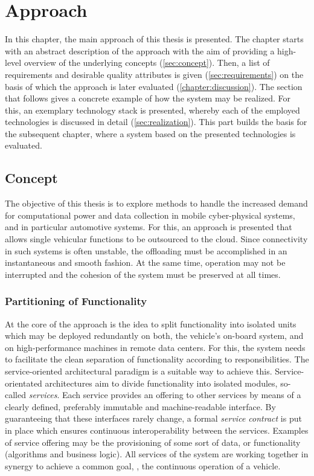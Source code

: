
\chapter{Approach}\label{chapter:realization}

In this chapter, the main approach of this thesis is presented. The chapter starts with an abstract description of the approach with the aim of providing a high-level overview of the underlying concepts (\autoref{sec:concept}). Then, a list of requirements and desirable quality attributes is given (\autoref{sec:requirements}) on the basis of which the approach is later evaluated (\autoref{chapter:discussion}). The section that follows gives a concrete example of how the system may be realized. For this, an exemplary technology stack is presented, whereby each of the employed technologies is discussed in detail (\autoref{sec:realization}). This part builds the basis for the subsequent chapter, where a system based on the presented technologies is evaluated.

%
%
%
%
%
%
%
%
%
%

\section{Concept} \label{sec:concept}
The objective of this thesis is to explore methods to handle the increased demand for computational power and data collection in mobile cyber-physical systems, and in particular automotive systems. For this, an approach is presented that allows single vehicular functions to be outsourced to the cloud.
Since connectivity in such systems is often unstable, the offloading must be accomplished in an instantaneous and smooth fashion. At the same time, operation may not be interrupted and the cohesion of the system must be preserved at all times. 

\subsection{Partitioning of Functionality}
At the core of the approach is the idea to split functionality into isolated units which may be deployed redundantly on both, the vehicle's on-board system, and on high-performance machines in remote data centers. For this, the system needs to facilitate the clean separation of functionality according to responsibilities. The service-oriented architectural paradigm is a suitable way to achieve this. Service-orientated architectures aim to divide functionality into isolated modules, so-called \emph{services}. Each service provides an offering to other services by means of a clearly defined, preferably immutable and machine-readable interface. By guaranteeing that these interfaces rarely change, a formal \emph{service contract} is put in place which ensures continuous interoperability between the services. Examples of service offering may be the provisioning of some sort of data, or functionality (algorithms and business logic). All services of the system are working together in synergy to achieve a common goal, \ie , the continuous operation of a vehicle. 


